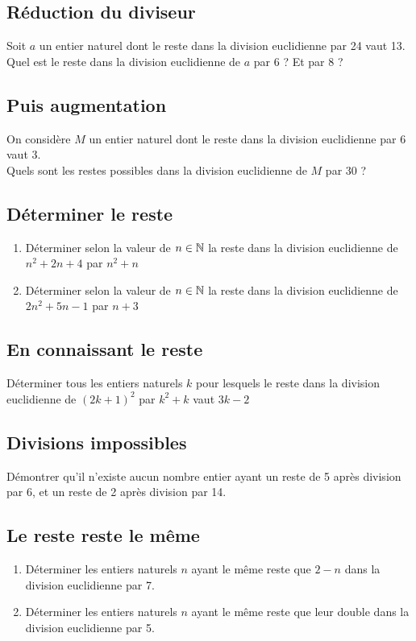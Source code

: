 \documentclass[oneside,12pt]{book}          %
\begin{document}
\subsection{Réduction du diviseur}
Soit $a$ un entier naturel dont le reste dans la division euclidienne par 24 vaut 13.\\
Quel est le reste dans la division euclidienne de $a$ par 6 ? Et par 8 ?



\subsection{Puis augmentation}
On considère $M$ un entier naturel dont le reste dans la division euclidienne par 6 vaut 3.\\
Quels sont les restes possibles dans la division euclidienne de $M$ par 30 ?



\subsection{Déterminer le reste}
\begin{enumerate}
	\item Déterminer selon la valeur de ${n\in\mathbb N}$ la reste dans la division euclidienne de $n^2+2n+4$ par $n^2+n$
	\item Déterminer selon la valeur de ${n\in\mathbb N}$ la reste dans la division euclidienne de $2n^2+5n-1$ par $n+3$ 
\end{enumerate}



\subsection{En connaissant le reste}
Déterminer tous les entiers naturels $k$ pour lesquels le reste dans la division euclidienne de $(2k+1)^2$ par $k^2+k$ vaut $3k-2$



\subsection{Divisions impossibles}
Démontrer qu'il n'existe aucun nombre entier ayant un reste de 5 après division par 6, et un reste de 2 après division par 14.



\subsection{Le reste reste le même}
\begin{enumerate}
	\item Déterminer les entiers naturels $n$ ayant le même reste que $2-n$ dans la division euclidienne par 7.
	\item Déterminer les entiers naturels $n$ ayant le même reste que leur double dans la division euclidienne par 5.
\end{enumerate}
\end{document}
